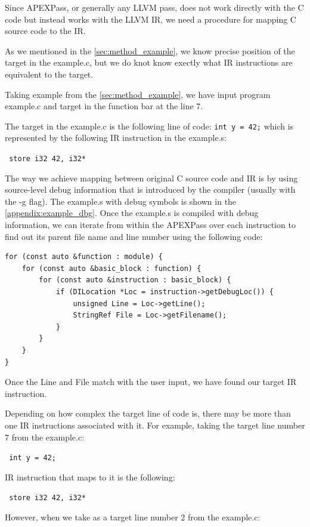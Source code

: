\documentclass[12pt, twoside]{fithesis2}
\renewcommand{\_}{\leavevmode \kern0.07em\vbox{\hrule width0.4em}}
\begin{document}
Since APEXPass, or generally any LLVM pass, does not work directly with the C
code but instead works with the LLVM IR, we need a procedure for mapping
C source code to the IR.

As we mentioned in the \autoref{sec:method_example}, we know precise position
of the target in the example.c, but we do knot know exectly what IR
instructions are equivalent to the target.

Taking example from the \autoref{sec:method_example}, we have input program
example.c and target in the function bar at the line 7.

The target in the example.c is the following line of code:
\texttt{int y = 42;}
which is represented by the following IR instruction in the example.s:

\texttt{
store i32 42, i32* %
}

The way we achieve mapping between original C source code and IR is by
using source-level debug information that is introduced by the compiler
(usually with the -g flag).
The example.s with debug symbols is shown in the \autoref{appendix:example_dbg}.
Once the example.s is compiled with debug information, we can iterate from within
the APEXPass over each instruction to find out its parent file name and
line number using the following code:\cite{llvm-dbg}

\begin{verbatim}
for (const auto &function : module) {
    for (const auto &basic_block : function) {
        for (const auto &instruction : basic_block) {
            if (DILocation *Loc = instruction->getDebugLoc()) {
                unsigned Line = Loc->getLine();
                StringRef File = Loc->getFilename();
            }
        }
    }
}
\end{verbatim}

Once the Line and File match with the user input, we have found our target
IR instruction.

Depending on how complex the target line of code is, there may be more than one
IR instructions associated with it. For example, taking the target line number
7 from the example.c:

\texttt{
int y = 42;
}

IR instruction that maps to it is the following:

\texttt{
store i32 42, i32* %
}

However, when we take as a target line number 2 from the example.c:
\end{document}
